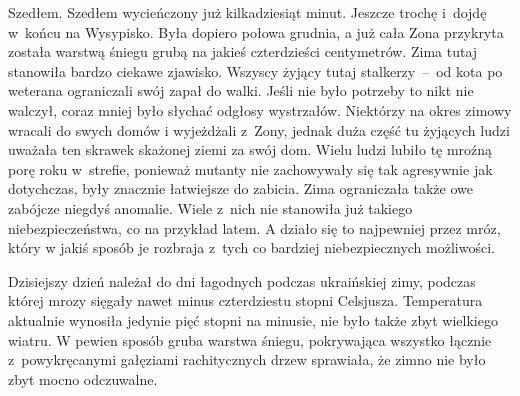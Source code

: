 \documentclass[../MAIN.tex]{subfiles}
\begin{document}
Szedłem. Szedłem wycieńczony już kilkadziesiąt minut. Jeszcze
trochę i~dojdę w~końcu na Wysypisko. Była dopiero połowa
grudnia, a już cała Zona przykryta została warstwą śniegu grubą
na jakieś czterdzieści centymetrów. Zima tutaj stanowiła bardzo
ciekawe zjawisko. Wszyscy żyjący tutaj stalkerzy~--~od kota po
weterana ograniczali swój zapał do walki. Jeśli nie było
potrzeby to nikt nie walczył, coraz mniej było słychać odgłosy
wystrzałów. Niektórzy na okres zimowy wracali do swych domów i
wyjeżdżali z~Zony, jednak duża część tu żyjących ludzi uważała
ten skrawek skażonej ziemi za swój dom. Wielu ludzi lubiło tę
mroźną porę roku w~strefie, ponieważ mutanty nie zachowywały
się tak agresywnie jak dotychczas, były znacznie łatwiejsze do
zabicia. Zima ograniczała także owe zabójcze niegdyś anomalie.
Wiele z~nich nie stanowiła już takiego niebezpieczeństwa, co na
przykład latem. A działo się to najpewniej przez mróz, który w
jakiś sposób je rozbraja z~tych co bardziej niebezpiecznych
możliwości.

Dzisiejszy dzień należał do dni łagodnych podczas ukraińskiej
zimy, podczas której mrozy sięgały nawet minus czterdziestu
stopni Celsjusza. Temperatura aktualnie wynosiła jedynie pięć
stopni na minusie, nie było także zbyt wielkiego wiatru. W
pewien sposób gruba warstwa śniegu, pokrywająca wszystko
łącznie z~powykręcanymi gałęziami rachitycznych drzew
sprawiała, że zimno nie było zbyt mocno \mbox{odczuwalne}.
\end{document}
